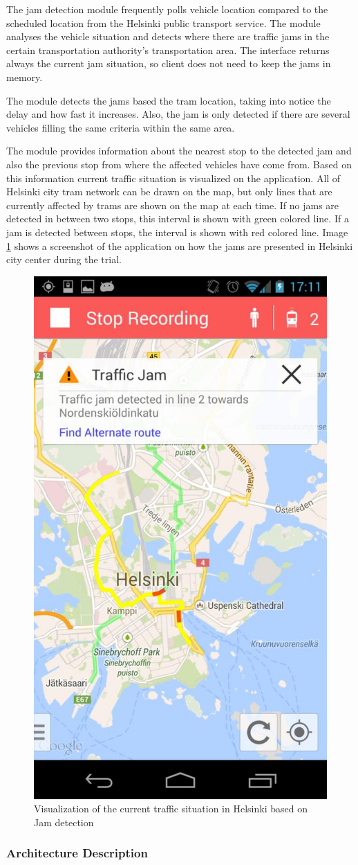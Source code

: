 The jam detection module frequently polls vehicle location compared to
the scheduled location from the Helsinki public transport service. The
module analyses the vehicle situation and detects where there are
traffic jams in the certain transportation authority’s transportation
area. The interface returns always the current jam situation, so
client does not need to keep the jams in memory.

The module detects the jams based the tram location, taking into
notice the delay and how fast it increases. Also, the jam is only
detected if there are several vehicles filling the same criteria
within the same area.  

The module provides information about the nearest stop to the detected
jam and also the previous stop from where the affected vehicles have
come from. Based on this information current traffic situation is
visualized on the application.  All of Helsinki city tram network can
be drawn on the map, but only lines that are currently affected by
trams are shown on the map at each time. If no jams are detected in
between two stops, this interval is shown with green colored line. If
a jam is detected between stops, the interval is shown with red
colored line. Image \ref{fig:tjd_screenshot} shows a screenshot of the
application on how the jams are presented in Helsinki city center
during the trial.

\begin{figure}
\centering
\includegraphics[width=0.3 \textwidth]{img/tjd/screenshot.jpg}
\caption{Visualization of the current traffic situation in Helsinki based on Jam detection}\label{fig:tjd_screenshot}
\end{figure}

\subsubsection*{\bf Architecture Description}

